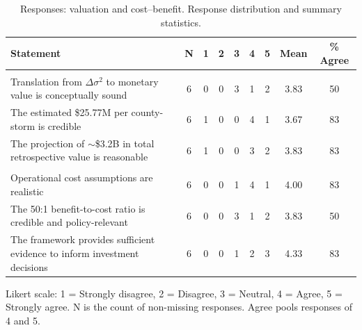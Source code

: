 \begin{table}[!h]

\caption{\label{tab:appD_likert_part2}Responses: valuation and cost--benefit. Response distribution and summary statistics.}
\centering
\begin{threeparttable}
\begin{tabular}[t]{lcccccccc}
\toprule
Statement & N & 1 & 2 & 3 & 4 & 5 & Mean & \% Agree\\
\midrule
\addlinespace[0.3em]
\multicolumn{9}{l}{\textbf{Valuation}}\\
\hspace{1em}Translation from $\Delta\sigma^2$ to monetary value is conceptually sound & 6 & 0 & 0 & 3 & 1 & 2 & 3.83 & 50\\
\hspace{1em}The estimated \$25.77M per county-storm is credible & 6 & 1 & 0 & 0 & 4 & 1 & 3.67 & 83\\
\hspace{1em}The projection of $\sim$\$3.2B in total retrospective value is reasonable & 6 & 1 & 0 & 0 & 3 & 2 & 3.83 & 83\\
\addlinespace[0.3em]
\multicolumn{9}{l}{\textbf{Cost--benefit}}\\
\hspace{1em}Operational cost assumptions are realistic & 6 & 0 & 0 & 1 & 4 & 1 & 4.00 & 83\\
\hspace{1em}The 50:1 benefit-to-cost ratio is credible and policy-relevant & 6 & 0 & 0 & 3 & 1 & 2 & 3.83 & 50\\
\hspace{1em}The framework provides sufficient evidence to inform investment decisions & 6 & 0 & 0 & 1 & 2 & 3 & 4.33 & 83\\
\bottomrule
\end{tabular}
\begin{tablenotes}[para]
\item Likert scale: 1 = Strongly disagree, 2 = Disagree, 3 = Neutral, 4 = Agree, 5 = Strongly agree. N is the count of non-missing responses. Agree pools responses of 4 and 5.
\end{tablenotes}
\end{threeparttable}
\end{table}
